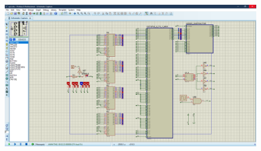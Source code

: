 \documentclass[fleqn]{article}
\begin{document}
\begin{figure}[!htbp]
  \includegraphics[width=\textwidth]{Assets/t7.png}
  \caption{}
  \label{t7}
\end{figure}
\end{document}
